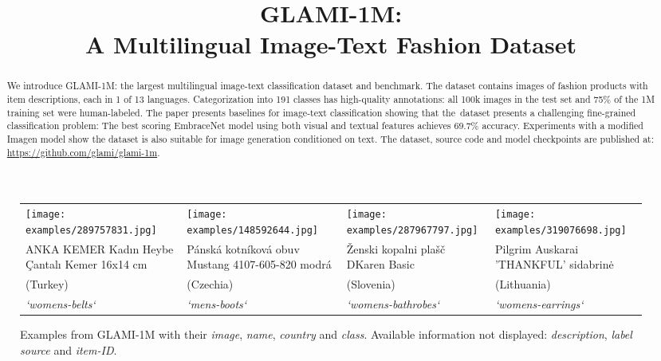 \documentclass{bmvc2k}
\title{GLAMI-1M:\\A Multilingual Image-Text Fashion Dataset}
\begin{document}














\maketitle              \begin{abstract}
We introduce GLAMI-1M: the largest multilingual image-text classification dataset and benchmark. The dataset contains images of fashion products with item descriptions, each in 1 of 13 languages. Categorization into 191 classes has high-quality annotations: all 100k images in the test set and 75\% of the 1M training set were human-labeled. The paper presents baselines for image-text classification showing that the~dataset presents a challenging fine-grained classification problem: The best scoring EmbraceNet model using both visual and textual features achieves 69.7\% accuracy. Experiments with a modified Imagen model show the dataset is also suitable for image generation conditioned on text.
The dataset, source code and model checkpoints are published at: \url{https://github.com/glami/glami-1m}. 
\end{abstract}




\begin{figure}[h!]
    \centering
    \vspace*{-0.6cm}
    \setlength{\tabcolsep}{1pt}
\renewcommand{\arraystretch}{0.8}
\small
\begin{tabular}{x{3cm} x{3cm} x{3cm} x{3cm}}
         \texttt{[image: examples/289757831.jpg]}
 &  \texttt{[image: examples/148592644.jpg]}
 & \texttt{[image: examples/287967797.jpg]}
 & \texttt{[image: examples/319076698.jpg]} \\
 ANKA KEMER Kadın Heybe Çantalı Kemer 16x14 cm
 & Pánská kotníková obuv Mustang 4107-605-820 modrá
 & Ženski kopalni plašč DKaren Basic & Pilgrim Auskarai 'THANKFUL' sidabrinė \\
 (Turkey) & (Czechia) & (Slovenia) & (Lithuania) \\
 \textit{`womens-belts`} & \textit{`mens-boots`} & \textit{`womens-bathrobes`} & \textit{`womens-earrings`} \\

\end{tabular}
\caption{Examples from GLAMI-1M with their \textit{image}, \textit{name}, \textit{country} and \textit{class}. Available information not displayed: \textit{description}, \textit{label source} and \textit{item-ID}.}
\label{fig:exampleFront}
\end{figure}
\vspace*{-.5cm}
\end{document}
